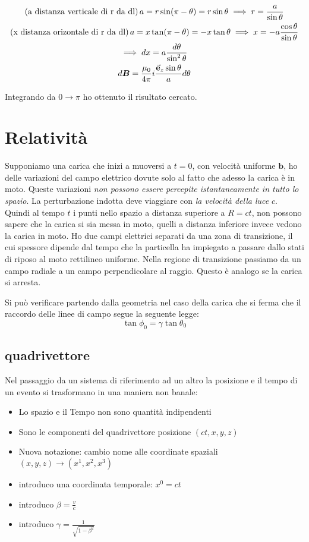 \documentclass[a4paper]{scrarticle}
\begin{document}
\begin{gather*}
    (\text{a distanza verticale di r da dl})\, a = r \sin(\pi - \theta) = r \sin \theta \implies r = \frac{a}{\sin \theta}\\
    (\text{x distanza orizontale di r da dl})\, a= x \tan (\pi -\theta) = -x \tan \theta \implies x = -a \frac{\cos \theta}{\sin \theta}\\
    \implies dx = a \frac{d \theta}{\sin^2 \theta}\\
    d \bm B = \frac{\mu_0}{4\pi}i \frac{\va e_z \sin \theta}{a}d\theta
\end{gather*}

Integrando da $0 \to \pi$ ho ottenuto il risultato cercato.

\section{Relatività}

Supponiamo una carica che inizi a muoversi a $t=0$, con velocità uniforme $\bm b$, ho delle variazioni del campo elettrico dovute solo al fatto che adesso la carica è in moto. Queste variazioni \emph{non possono essere percepite istantaneamente in tutto lo spazio}. La perturbazione indotta deve viaggiare con \emph{la velocità della luce} $c$.
Quindi al tempo $t$ i punti nello spazio a distanza superiore a  $R=ct$, non possono sapere che la carica si sia messa in moto, quelli a distanza inferiore invece vedono la carica in moto. Ho due campi elettrici separati da una zona di transizione, il cui spessore dipende dal tempo che la particella ha impiegato a passare dallo stati di riposo al moto rettilineo uniforme.
Nella regione di transizione passiamo da un campo radiale  a un campo perpendicolare al raggio. Questo è analogo se la carica si arresta.

Si può verificare partendo dalla geometria nel caso della carica che si ferma che il raccordo delle linee di campo segue la seguente legge:
\begin{equation*}
    \tan \phi_0 = \gamma \tan \theta_0
\end{equation*}

\subsection{quadrivettore}

Nel passaggio da un sistema di riferimento ad un altro la posizione e il tempo di un evento si trasformano in una maniera non banale:
\begin{itemize}
    \item Lo spazio e il Tempo non sono quantità indipendenti
    \item Sono le componenti del quadrivettore posizione $(ct,x,y,z)$
    \item Nuova notazione: cambio nome alle coordinate spaziali $(x,y,z) \to (x^1, x^2, x^3)$
    \item introduco una coordinata temporale: $x^0 = ct$
    \item introduco $\beta= \frac{v}{c}$
    \item introduco $\gamma = \frac{1}{\sqrt{1 - \beta^2}}$
\end{itemize}
\end{document}
